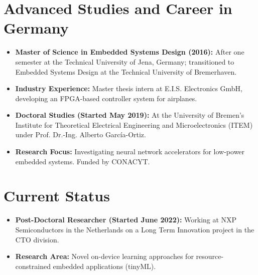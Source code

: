 \documentclass{article}
\begin{document}
\section*{Advanced Studies and Career in Germany}
\begin{itemize}[noitemsep]
    \item \textbf{Master of Science in Embedded Systems Design (2016):} After one semester at the Technical University of Jena, Germany; transitioned to Embedded Systems Design at the Technical University of Bremerhaven.
    \item \textbf{Industry Experience:} Master thesis intern at E.I.S. Electronics GmbH, developing an FPGA-based controller system for airplanes.
    \item \textbf{Doctoral Studies (Started May 2019):} At the University of Bremen's Institute for Theoretical Electrical Engineering and Microelectronics (ITEM) under Prof. Dr.-Ing. Alberto García-Ortiz.
    \item \textbf{Research Focus:} Investigating neural network accelerators for low-power embedded systems. Funded by CONACYT.
\end{itemize}

\section*{Current Status}
\begin{itemize}[noitemsep]
    \item \textbf{Post-Doctoral Researcher (Started June 2022):} Working at NXP Semiconductors in the Netherlands on a Long Term Innovation project in the CTO division.
    \item \textbf{Research Area:} Novel on-device learning approaches for resource-constrained embedded applications (tinyML).
\end{itemize}
\end{document}
